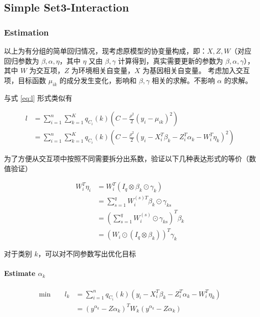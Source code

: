 \documentclass[12pt, a4paper, oneside]{article}
\numberwithin{equation}{section}
\begin{document}
\subsection{Simple Set3-Interaction}

\subsubsection{Estimation}

以上为有分组的简单回归情况，现考虑原模型的协变量构成，即：$X,Z,W$（对应回归参数为 $\beta, \alpha, \eta$，其中 $\eta$ 又由 $\beta,\gamma$ 计算得到，真实需要更新的参数为 $\beta, \alpha, \gamma$），其中 $W$ 为交互项，$Z$ 为环境相关自变量，$X$ 为基因相关自变量。 
考虑加入交互项，目标函数 $\mu_{ik}$ 的成分发生变化，影响和 $\beta,\gamma$ 相关的求解。不影响 $\alpha$ 的求解。

与式 \ref{eq:l} 形式类似有

\begin{equation}
	\begin{aligned}
		l &= \displaystyle\sum_{i=1}^{n}\sum_{k=1}^{K}q_{C_i}(k)\left(C - \frac{\rho^2}{2}(y_i - \mu_{ik})^2 \right) \\
		&= \displaystyle\sum_{i=1}^{n}\sum_{k=1}^{K}q_{C_i}(k)\left(C - \frac{\rho^2}{2}(y_i - X_i^T \beta_k - Z_i^T \alpha_k - W_i^T \eta_k)^2 \right)
	\end{aligned}
\end{equation}

为了方便从交互项中按照不同需要拆分出系数，验证以下几种表达形式的等价（数值验证）

\begin{equation}
	\begin{aligned}
		W_i^T \eta_i &= W_i^T(I_q\otimes\beta_k \odot \gamma_k) \\
		&= \sum_{s=1}^{q}W_i^{(s)T}\beta_k\odot \gamma_{ks} \\
		&= (\sum_{s=1}^{q}W_i^{(s)}\odot \gamma_{ks})^T \beta_k \\
		&= (W_i \odot (I_q \otimes \beta_k))^T \gamma_k
	\end{aligned}
\label{eq:same}
\end{equation}

对于类别 $k$，可以对不同参数写出优化目标

\paragraph{Estimate $\alpha_k$}

\begin{equation}
	\begin{aligned}
		\text{min}\qquad l_k &=  \displaystyle\sum_{i=1}^{n}q_{C_i}(k)\left(y_i - X_i^T \beta_k - Z_i^T \alpha_k - W_i^T \eta_k\right) \\
		&= (y^{\alpha_k} - Z\alpha_k)^T W_k (y^{\alpha_k} - Z\alpha_k)
	\end{aligned}
\end{equation}
\end{document}
